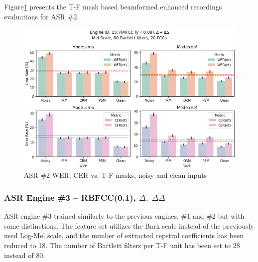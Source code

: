 Figure\;\ref{fig:asr15_wer_masks} presents the T-F mask based
beamformed enhanced recordings evaluations for ASR \#2.
\begin{figure}[H]
    \centering
    \includegraphics[width=0.95\linewidth]{ASR/images/asr15_wer_masks.png}
    \caption{ASR \#2 WER, CER vs. T-F masks, noisy and clean inputs }\label{fig:asr15_wer_masks}
\end{figure}

\subsubsection{ASR Engine \#3 -- RBFCC(0.1), \(\Delta,\;\Delta\Delta\)}
ASR engine \#3 trained similarly to the previous
engines, \#1 and \#2 but with some distinctions.
The feature set utilizes the Bark scale instead of the previously
used Log-Mel scale, and the number of extracted cepstral 
coefficients has been reduced to 18. 
The number of Bartlett filters per T-F unit has been set
to 28 instead of 80.

\bigskip

